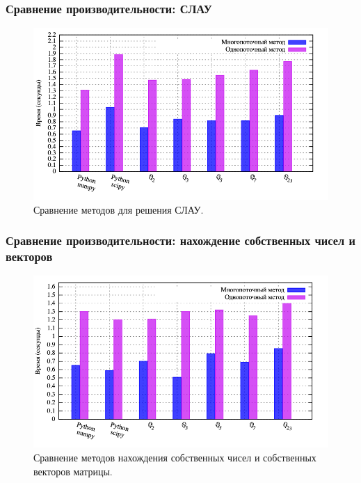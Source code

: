 \documentclass[10pt,professionalfont,utf8,presentation,compress]{beamer}
\theoremstyle{definition}
\theoremstyle{plain}
\begin{document}
\begin{frame}
\frametitle{Сравнение производительности: СЛАУ}
\begin{figure}[H]
\centerline{\includegraphics[width=0.95\linewidth]{../gnuplot/multi/gauss/plot.png}}
\caption{Сравнение методов для решения СЛАУ.}
\label{img:multi:gauss}
\end{figure}
\end{frame}


\begin{frame}
\frametitle{Сравнение производительности: нахождение собственных чисел и векторов}
\begin{figure}[H]
\centerline{\includegraphics[width=0.95\linewidth]{../gnuplot/multi/jacoby/plot.png}}
\caption{Сравнение методов нахождения собственных чисел и собственных векторов матрицы.}
\label{img:multi:jacoby}
\end{figure}
\end{frame}
\end{document}
